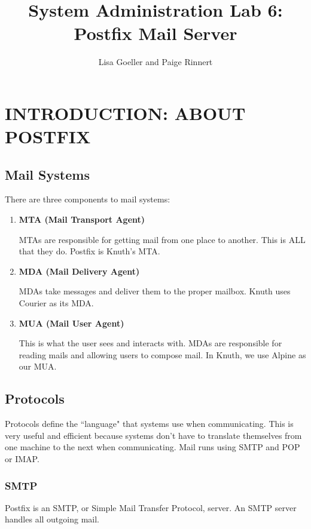 \documentclass{article}
\title{System Administration Lab 6: Postfix Mail Server\vspace{-2ex}}
\author{Lisa Goeller and Paige Rinnert}
\date{}
\begin{document}
\maketitle



\section*{INTRODUCTION: ABOUT POSTFIX}

\subsection*{Mail Systems}

There are three components to mail systems:

\begin{enumerate}

\item \textbf{MTA (Mail Transport Agent)}

MTAs are responsible for getting mail from one place to another. This is ALL that they do. Postfix is Knuth's MTA.

\item \textbf{MDA (Mail Delivery Agent)}

MDAs take messages and deliver them to the proper mailbox. Knuth uses Courier as its MDA.

\item \textbf{MUA (Mail User Agent)}

This is what the user sees and interacts with. MDAs are responsible for reading mails and allowing users to compose mail. In Knuth, we use Alpine as our MUA.

\end{enumerate}

\subsection*{Protocols}

\indent\indent Protocols define the ``language" that systems use when communicating. This is very useful and efficient because systems don't have to translate themselves from one machine to the next when communicating. Mail runs using SMTP and POP or IMAP.

\subsubsection*{SMTP}

Postfix is an SMTP, or Simple Mail Transfer Protocol,
server. An SMTP server handles all outgoing mail.
\end{document}
